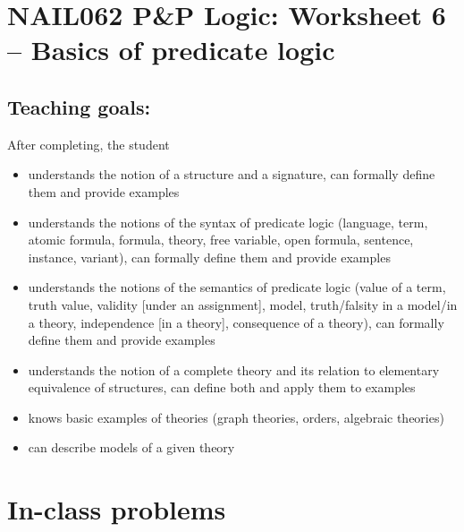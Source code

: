 \section*{NAIL062 P\&P Logic: Worksheet 6 -- Basics of predicate logic}


\subsection*{Teaching goals:} After completing, the student

\begin{itemize}\setlength{\itemsep}{0pt}
    \item understands the notion of a structure and a signature, can formally define them and provide examples
    \item understands the notions of the syntax of predicate logic (language, term, atomic formula, formula, theory, free variable, open formula, sentence, instance, variant), can formally define them and provide examples
    \item understands the notions of the semantics of predicate logic (value of a term, truth value, validity [under an assignment], model, truth/falsity in a model/in a theory, independence [in a theory], consequence of a theory), can formally define them and provide examples
    \item understands the notion of a complete theory and its relation to elementary equivalence of structures, can define both and apply them to examples
    \item knows basic examples of theories (graph theories, orders, algebraic theories)
    \item can describe models of a given theory    
\end{itemize}
    

\section*{In-class problems}


